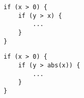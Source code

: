 
\noindent\begin{minipage}{.45\textwidth}
\begin{lstlisting}[style=CStyle, caption=Nested if conditions., label=equivalentexample]
if (x > 0) {
	if (y > x) {
		...
	}
}
\end{lstlisting}
\end{minipage}\hfill
\begin{minipage}{.45\textwidth}
\begin{lstlisting}[style=CStyle, caption=Mutated nested if conditions., label=equivalentmutantexample]
if (x > 0) {
	if (y > abs(x)) {
		...
	}
}
\end{lstlisting}
\end{minipage}